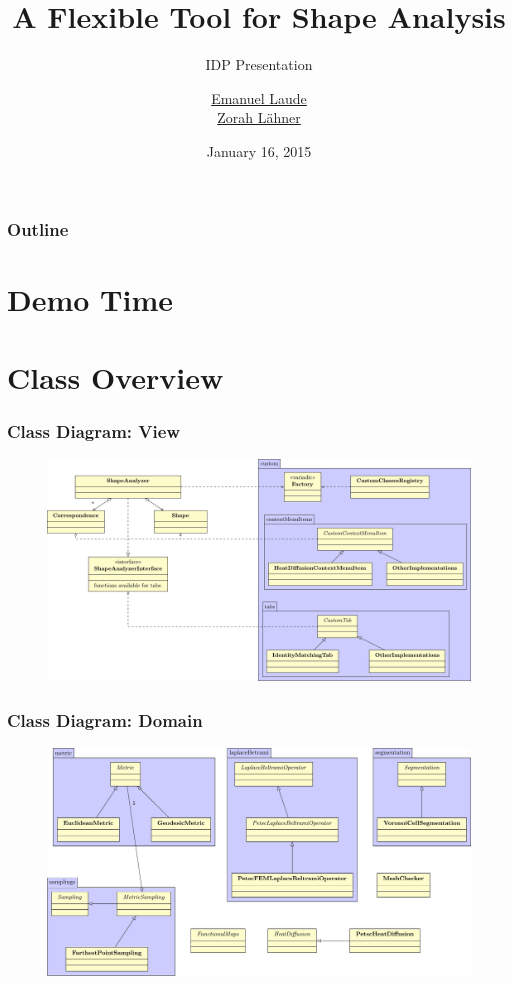 \documentclass[compress]{beamer}
\title{A Flexible Tool for Shape Analysis}
\subtitle{IDP Presentation}
\author{\href{emanuel.laude@in.tum.de}{Emanuel Laude}\\ \href{laehner@in.tum.de}{Zorah L\"ahner} }
\date{January 16, 2015}
\institute{Technische Universit\"at M\"unchen}
\begin{document}
\begin{frame}
  \titlepage
\end{frame}

\begin{frame}
  \frametitle{Outline}
  \tableofcontents
\end{frame}

\section{Demo Time}

\section{Class Overview}

\begin{frame}
  \frametitle{Class Diagram: View}
  \begin{figure}[h]
	\centering
	\includegraphics[width=\textwidth]{diagram.pdf}
\end{figure}
\end{frame}

\begin{frame}
  \frametitle{Class Diagram: Domain}
  \begin{figure}[h]
	\centering
	\includegraphics[width=\textwidth]{diagram2.pdf}
\end{figure}
\end{frame}
\end{document}
